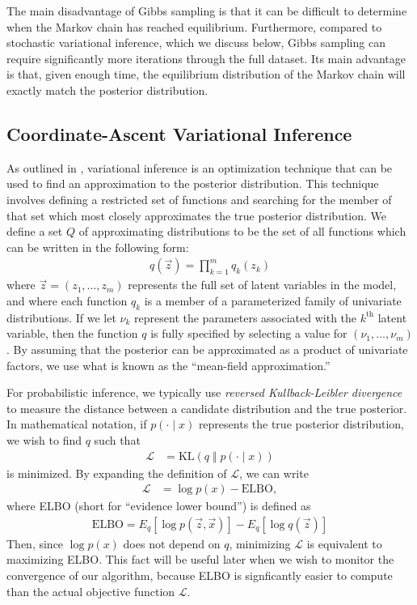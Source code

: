 \documentclass{article}
\newcommand{\nth}{^{\text{th}}}
\begin{document}
The main disadvantage of Gibbs sampling is that it can be difficult to determine when the Markov chain has reached equilibrium.
Furthermore, compared to stochastic variational inference, which we discuss below, Gibbs sampling can require significantly more iterations through the full dataset.
Its main advantage is that, given enough time, the equilibrium distribution of the Markov chain will exactly match the posterior distribution.

\subsection{Coordinate-Ascent Variational Inference}
\label{sec:cavi}

As outlined in \cite{blei2017variational}, variational inference is an optimization technique that can be used to find an approximation to the posterior distribution.
This technique involves defining a restricted set of functions and searching for the member of that set which most closely approximates the true posterior distribution.
We define a set $Q$ of approximating distributions to be the set of all functions which can be written in the following form:
\begin{align}
q(\vec z) = \prod_{k=1}^m q_k(z_k)
\end{align}
where $\vec z = (z_1, \ldots, z_m)$ represents the full set of latent variables in the model, and where each function $q_k$ is a member of a parameterized family of univariate distributions.
If we let $\nu_k$ represent the parameters associated with the $k\nth$ latent variable, then the function $q$ is fully specified by selecting a value for $(\nu_1, \ldots, \nu_m)$.
By assuming that the posterior can be approximated as a product of univariate factors, we use what is known as the ``mean-field approximation.''

For probabilistic inference, we typically use \emph{reversed Kullback-Leibler divergence} to measure the distance between a candidate distribution and the true posterior.
In mathematical notation, if $p(\cdot \mid x)$ represents the true posterior distribution, we wish to find $q$ such that
\begin{align}
\mathcal L &= \text{KL}( q \;\Vert\; p(\cdot \mid x) )
\end{align}
is minimized.
By expanding the definition of $\mathcal L$, we can write
\begin{align}
\mathcal L &= \log p(x) - \text{ELBO},
\end{align}
where ELBO (short for ``evidence lower bound'') is defined as
\begin{align}
\text{ELBO} = E_q[\log p(\vec z, \vec x)] - E_q[\log q(\vec z)]
\end{align}
Then, since $\log p(x)$ does not depend on $q$, minimizing $\mathcal L$ is equivalent to maximizing ELBO.
This fact will be useful later when we wish to monitor the convergence of our algorithm, because ELBO is signficantly easier to compute than the actual objective function $\mathcal L$.
\end{document}
